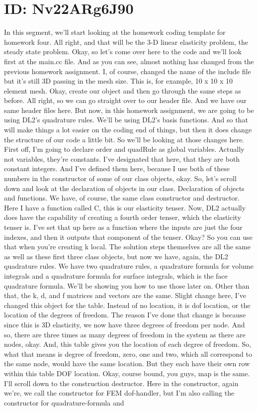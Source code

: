 \documentclass[10pt]{article}
\begin{document}
\section*{ID: Nv22ARg6J90}
In this segment, we'll start looking at the homework coding template for homework four. All right, and that will be the 3-D linear elasticity problem, the steady state problem. Okay, so let's come over here to the code and we'll look first at the main.cc file. And as you can see, almost nothing has changed from the previous homework assignment. I, of course, changed the name of the include file but it's still 3D passing in the mesh size. This is, for example, 10 x 10 x 10 element mesh. Okay, create our object and then go through the same steps as before. All right, so we can go straight over to our header file. And we have our same header files here. But now, in this homework assignment, we are going to be using DL2's quadrature rules. We'll be using DL2's basis functions. And so that will make things a lot easier on the coding end of things, but then it does change the structure of our code a little bit. So we'll be looking at those changes here. First off, I'm going to declare order and quadRule as global variables. Actually not variables, they're constants. I've designated that here, that they are both constant integers. And I've defined them here, because I use both of these numbers in the constructor of some of our class objects, okay. So, let's scroll down and look at the declaration of objects in our class. Declaration of objects and functions. We have, of course, the same class constructor and destructor. Here I have a function called C, this is our elasticity tenser. Now, DL2 actually does have the capability of creating a fourth order tenser, which the elasticity tenser is. I've set that up here as a function where the inputs are just the four indexes, and then it outputs that component of the tenser. Okay? So you can use that when you're creating k local. The solution steps themselves are all the same as well as these first three class objects, but now we have, again, the DL2 quadrature rules. We have two quadrature rules, a quadrature formula for volume integrals and a quadrature formula for surface integrals, which is the face quadrature formula. We'll be showing you how to use those later on. Other than that, the k, d, and f matrices and vectors are the same. Slight change here, I've changed this object for the table. Instead of no location, it is dof location, or the location of the degrees of freedom. The reason I've done that change is because since this is 3D elasticity, we now have three degrees of freedom per node. And so, there are three times as many degrees of freedom in the system as there are nodes, okay. And, this table gives you the location of each degree of freedom. So, what that means is degree of freedom, zero, one and two, which all correspond to the same node, would have the same location. But they each have their own row within this table DOF location. Okay, course bound, you guys, map is the same. I'll scroll down to the construction destructor. Here in the constructor, again we're, we call the constructor for FEM dof-handler, but I'm also calling the constructor for quadrature-formula and 
\end{document}
